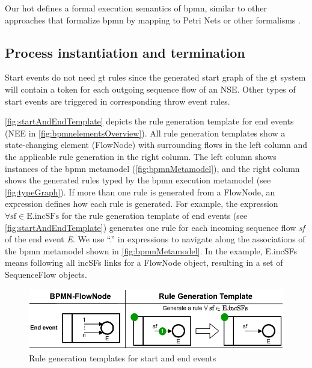\documentclass{lmcs} %
\theoremstyle{plain}\newtheorem{satz}[thm]{Satz} %
\begin{document}
Our \gls*{hot} defines a formal execution semantics of \gls*{bpmn}, similar to other approaches that formalize \gls*{bpmn} by mapping to Petri Nets or other formalisms \cite{dijkmanSemanticsAnalysisBusiness2008}.

\subsection{Process instantiation and termination} \label{subsec:instAndTermination}

Start events do not need \gls*{gt} rules since the generated start graph of the \gls*{gt} system will contain a token for each outgoing sequence flow of an NSE.
Other types of start events are triggered in corresponding throw event rules.

\autoref{fig:startAndEndTemplate} depicts the rule generation template for end events (\textsf{NEE} in \autoref{fig:bpmnelementsOverview}).
All rule generation templates show a state-changing element (\textsf{FlowNode}) with surrounding flows in the left column and the applicable rule generation in the right column.
The left column shows instances of the \gls*{bpmn} metamodel (\autoref{fig:bpmnMetamodel}), and the right column shows the generated rules typed by the \gls*{bpmn} execution metamodel (see \autoref{fig:typeGraph}).
If more than one rule is generated from a \textsf{FlowNode}, an expression defines how each rule is generated.
For example, the expression $\forall \text{sf} \in \text{E.incSFs}$ for the rule generation template of end events (see \autoref{fig:startAndEndTemplate}) generates one rule for each incoming sequence flow \textit{sf} of the end event \textit{E}.
We use ``.'' in expressions to navigate along the associations of the \gls*{bpmn} metamodel shown in \autoref{fig:bpmnMetamodel}.
In the example, \textsf{E.incSFs} means following all \textsf{incSFs} links for a \textsf{FlowNode} object, resulting in a set of \textsf{SequenceFlow} objects.

\begin{figure}[ht]
    \centering
    \includegraphics[width=1\textwidth]{images/end_template.pdf}
    \caption{Rule generation templates for start and end events}
    \label{fig:startAndEndTemplate}
\end{figure}
    
\end{document}
